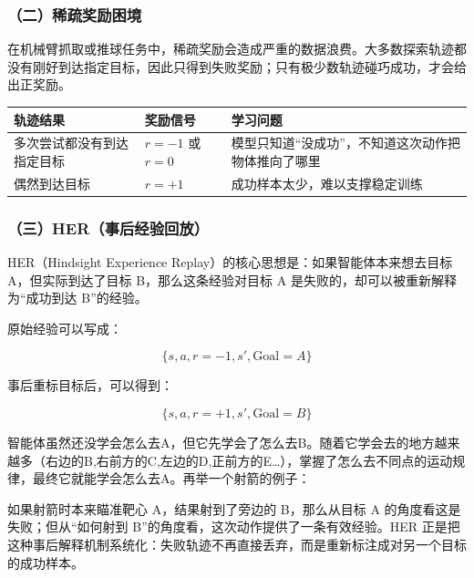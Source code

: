 \hypertarget{ux4e8cux7a00ux758fux5956ux52b1ux56f0ux5883}{%
\subsubsection{（二）稀疏奖励困境}\label{ux4e8cux7a00ux758fux5956ux52b1ux56f0ux5883}}

在机械臂抓取或推球任务中，稀疏奖励会造成严重的数据浪费。大多数探索轨迹都没有刚好到达指定目标，因此只得到失败奖励；只有极少数轨迹碰巧成功，才会给出正奖励。

\begin{longtable}[]{@{}
  >{\raggedright\arraybackslash}p{}
  >{\raggedright\arraybackslash}p{}
  >{\raggedright\arraybackslash}p{}@{}}
\toprule
轨迹结果 & 奖励信号 & 学习问题 \\
\midrule
\endhead
多次尝试都没有到达指定目标 & \(r=-1\) 或 \(r=0\) & 模型只知道``没成功''，不知道这次动作把物体推向了哪里 \\
偶然到达目标 & \(r=+1\) & 成功样本太少，难以支撑稳定训练 \\
\bottomrule
\end{longtable}

\hypertarget{ux4e09herux4e8bux540eux7ecfux9a8cux56deux653e}{%
\subsubsection{（三）HER（事后经验回放）}\label{ux4e09herux4e8bux540eux7ecfux9a8cux56deux653e}}

HER（Hindsight Experience Replay）的核心思想是：如果智能体本来想去目标 A，但实际到达了目标 B，那么这条经验对目标 A 是失败的，却可以被重新解释为``成功到达 B''的经验。

原始经验可以写成：

\[
\{s,a,r=-1,s',\mathrm{Goal}=A\}
\]

事后重标目标后，可以得到：

\[
\{s,a,r=+1,s',\mathrm{Goal}=B\}
\]

智能体虽然还没学会怎么去A，但它先学会了怎么去B。随着它学会去的地方越来越多（右边的B,右前方的C,左边的D,正前方的E\ldots），掌握了怎么去不同点的运动规律，最终它就能学会怎么去A。再举一个射箭的例子：

如果射箭时本来瞄准靶心 A，结果射到了旁边的 B，那么从目标 A 的角度看这是失败；但从``如何射到 B''的角度看，这次动作提供了一条有效经验。HER 正是把这种事后解释机制系统化：失败轨迹不再直接丢弃，而是重新标注成对另一个目标的成功样本。

